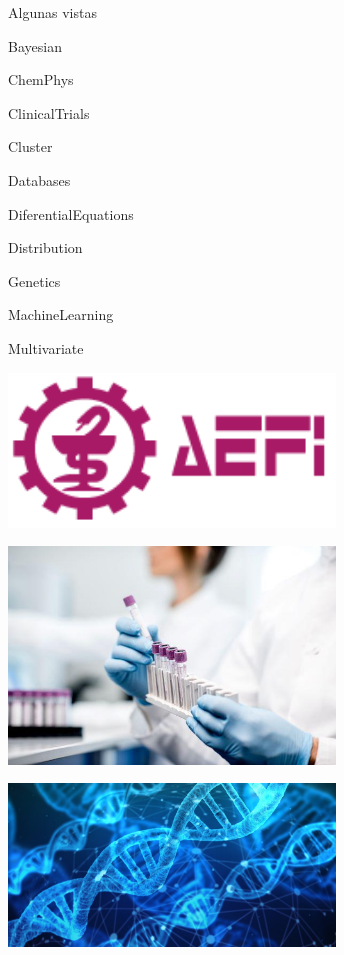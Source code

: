 \documentclass[xcolor=table]{beamer}
\begin{document}
\begin{frame}{Algunas vistas}

\begin{itemize}
\begin{minipage}{0.45\textwidth}
\item Bayesian
\item ChemPhys
\item ClinicalTrials
\item Cluster
\item Databases
\item DiferentialEquations
\item Distribution
\item Genetics
\item MachineLearning
\item Multivariate
\end{minipage}
\begin{minipage}{0.45\textwidth}
\begin{minipage}{\textwidth}
\includegraphics[width=0.65\textwidth]{aefi.png}
\vspace{1cm}
\end{minipage}
\begin{minipage}{\textwidth}
\includegraphics[width=0.65\textwidth]{ensayo.jpg}
\vspace{1cm}
\end{minipage}
\begin{minipage}{\textwidth}
\includegraphics[width=0.65\textwidth]{genetica.jpg}
\end{minipage}
\end{minipage}
\end{itemize}
\end{frame}
\end{document}
